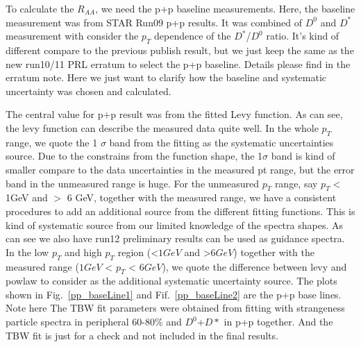 To calculate the $R_{AA}$, we need the p+p baseline measurements. Here, the baseline measurement was from STAR Run09 p+p results. It was combined of $D^0$ and $D^{*}$ measurement with consider the $p_T$ dependence of the $D^*$/$D^0$ ratio. It's kind of different compare to the previous publish result, but we just keep the same as the new run10/11 PRL erratum to select the p+p baseline. Details please find in the erratum note. Here we just want to clarify how the baseline and systematic uncertainty was chosen and calculated.


The central value for p+p result was from the fitted Levy function. As can see, the levy function can describe the measured data quite well. In the whole $p_T$ range, we quote the 1 $\sigma$ band from the fitting as the systematic uncertainties source. Due to the constrains from the function shape, the 1$\sigma$ band is kind of smaller compare to the data uncertainties in the measured pt range, but the error band in the unmeasured range is huge. For the unmeasured $p_T$ range, say $p_T <$ 1GeV and $>$ 6 GeV, together with the measured range, we have a consistent procedures to add an additional source from the different fitting functions. This is kind of systematic source from our limited knowledge of the spectra shapes. As can see we also have run12 preliminary results can be used as guidance spectra. In the low $p_T$ and high $p_T$ region (<$1 GeV$ and >$6 GeV$) together with the measured range ($ 1GeV$ < $p_{T}$ < $6 GeV$), we quote the difference between levy and powlaw to consider as the additional systematic uncertainty source. The plots shown in Fig.~\ref{pp_baseLine1} and Fif.~\ref{pp_baseLine2} are the p+p base lines. Note here The TBW fit parameters were obtained from fitting with strangeness particle spectra in peripheral 60-80\% and $D^0$+$D*$ in p+p together. And the TBW fit is just for a check and not included in the final results.

